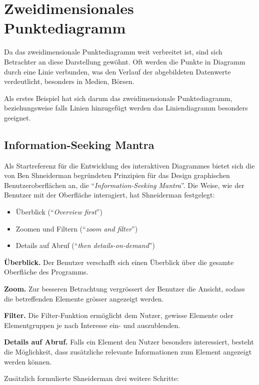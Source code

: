 \section{Zweidimensionales Punktediagramm}

Da das zweidimensionale Punktediagramm weit verbreitet ist, sind sich Betrachter an diese Darstellung gewöhnt. Oft werden die Punkte in Diagramm durch eine Linie verbunden, was den Verlauf der abgebildeten Datenwerte verdeutlicht, besonders in Medien, Börsen. 

Als erstes Beispiel hat sich darum das zweidimensionale Punktediagramm, beziehungsweise falls Linien hinzugefügt werden das Liniendiagramm besonders geeignet.

\subsection{Information-Seeking Mantra}

Als Startreferenz für die Entwicklung des interaktiven Diagrammes bietet sich die von Ben Shneiderman begründeten Prinzipien für das Design graphischen Benutzeroberflächen an, die "`\textit{Information-Seeking Mantra}"'. Die Weise, wie der Benutzer mit der Oberfläche interagiert, hat Shneiderman \cite{shneiderman} festgelegt:

\begin{itemize}
	\item Überblick ("`\textit{Overview first}"')
	\item Zoomen und Filtern ("`\textit{zoom and filter}"')
	\item Details auf Abruf ("`\textit{then details-on-demand}"')
\end{itemize}

\textbf{Überblick.} Der Benutzer verschafft sich einen Überblick über die gesamte Oberfläche des Programms.

\textbf{Zoom.} Zur besseren Betrachtung vergrössert der Benutzer die Ansicht, sodass die betreffenden Elemente grösser angezeigt werden.

\textbf{Filter.} Die Filter-Funktion ermöglicht dem Nutzer, gewisse Elemente oder Elementgruppen je nach Interesse ein- und auszublenden.

\textbf{Details auf Abruf.} Falls ein Element den Nutzer besonders interessiert, besteht die Möglichkeit, dass zusätzliche relevante Informationen zum Element angezeigt werden können.

Zusätzlich formulierte Shneiderman drei weitere Schritte:

